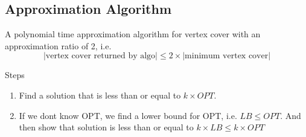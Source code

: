 \documentclass[11pt]{article}
\begin{document}
\subsection*{Approximation Algorithm}

\begin{example}
    A polynomial time approximation algorithm for vertex cover with an approximation ratio of 2, i.e. 
    \[
        |\text{vertex cover returned by algo} | \leq 2 \times | \text{minimum vertex cover} | 
    \]
    \begin{solution}
        Steps 
        \begin{enumerate}
            \item Find a solution that is less than or equal to $k \times OPT$. 
            \item If we dont know OPT, we find a lower bound for OPT, i.e. $LB \leq OPT$. And then show that solution is less than or equal to $k\times LB \leq k \times OPT$
        \end{enumerate}
    \end{solution}
\end{example}
\end{document}
